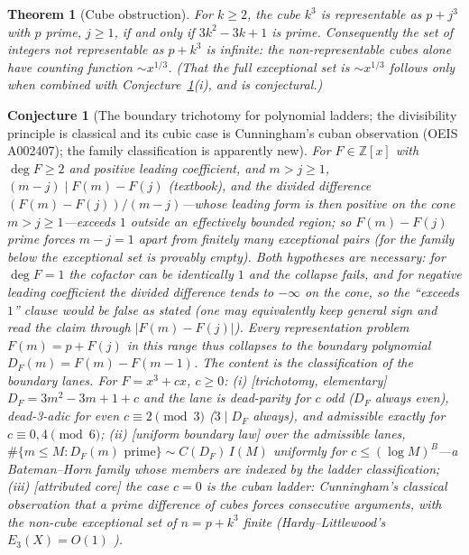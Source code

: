 \documentclass[11pt]{article}
\newtheorem{conjecture}{Conjecture}
\newtheorem{theorem}{Theorem}
\theoremstyle{definition}
\begin{document}
\begin{theorem}[Cube obstruction]\label{t:cube}
For $k\ge2$, the cube $k^3$ is representable as $p+j^3$ with $p$ prime,
$j\ge1$, if and only if $3k^2-3k+1$ is prime.  Consequently the set of
integers not representable as $p+k^3$ is infinite: the non-representable
\emph{cubes} alone have counting function $\sim x^{1/3}$.  (That the
full exceptional set is $\sim x^{1/3}$ follows only when combined with
Conjecture~\ref{c13}(i), and is conjectural.)
\end{theorem}

\setcounter{conjecture}{21}%
\begin{conjecture}[The boundary trichotomy for polynomial ladders; the
divisibility principle is classical and its cubic case is
Cunningham's cuban observation (OEIS A002407); the family
classification is apparently new]\label{c13}
For $F\in\mathbb Z[x]$ with $\deg F\ge2$ and \emph{positive leading
coefficient}, and $m>j\ge1$,
$(m-j)\mid F(m)-F(j)$ (textbook), and the divided difference
$(F(m)-F(j))/(m-j)$---whose leading form is then positive on the cone
$m>j\ge1$---exceeds $1$ outside an effectively bounded region; so
$F(m)-F(j)$ prime forces $m-j=1$ apart from finitely many
exceptional pairs (for the family below the exceptional set is
provably \emph{empty}).  Both hypotheses are necessary: for
$\deg F=1$ the cofactor can be identically $1$ and the collapse
fails, and for negative leading coefficient the divided difference
tends to $-\infty$ on the cone, so the ``exceeds $1$'' clause would be
false as stated (one may equivalently keep general sign and read the
claim through $|F(m)-F(j)|$).  Every representation problem $F(m)=p+F(j)$ in
this range
thus collapses to the boundary polynomial $D_F(m)=F(m)-F(m-1)$.  The content
is the classification
of the boundary lanes.  For $F=x^3+cx$, $c\ge0$:
\emph{(i)} [trichotomy, elementary] $D_F=3m^2-3m+1+c$ and the lane is
\emph{dead-parity} for $c$ odd ($D_F$ always even),
\emph{dead-3-adic} for even $c\equiv2\pmod3$ ($3\mid D_F$ always),
and admissible exactly for $c\equiv0,4\pmod6$;
\emph{(ii)} [uniform boundary law] over the admissible lanes,
$\#\{m\le M: D_F(m) \text{ prime}\}\sim C(D_F)\,I(M)$ uniformly for
$c\le(\log M)^B$---a Bateman--Horn family whose members are indexed
by the ladder classification;
\emph{(iii)} [attributed core] the case $c=0$ is the cuban ladder:
Cunningham's classical observation that a prime difference of cubes
forces consecutive arguments, with the non-cube exceptional set of
$n=p+k^3$ finite (Hardy--Littlewood's $E_3(X)=O(1)$ \cite{HL1923}).
\end{conjecture}
\end{document}
